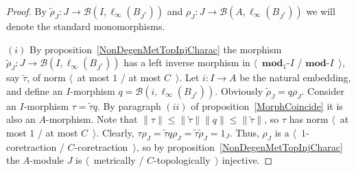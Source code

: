 \begin{proof} By $\widetilde{\rho}_J:J\to\mathcal{B}(I,\ell_\infty(B_{J^*}))$
and $\rho_J:J\to\mathcal{B}(A,\ell_\infty(B_{J^*}))$ we will denote the standard
monomorphisms.

$(i)$ By proposition~\ref{NonDegenMetTopInjCharac} the morphism
$\widetilde{\rho}_J: J\to\mathcal{B}(I,\ell_\infty(B_{J^*}))$ has a left inverse
morphism in $\langle$~$\mathbf{mod}_1\text{-}I$ / $\mathbf{mod}\text{-}I$~$\rangle$, say
$\widetilde{\tau}$, of norm $\langle$~at most $1$ / at most $C$~$\rangle$. Let
$i:I\to A$ be the natural embedding, and define an $I$-morphism
$q=\mathcal{B}(i,\ell_\infty(B_{J^*}))$. Obviously
$\widetilde{\rho}_J=q\rho_J$. Consider an $I$-morphism $\tau =\widetilde{\tau} q$.
By paragraph $(ii)$ of proposition~\ref{MorphCoincide} it is also an
$A$-morphism. Note that 
$\lVert\tau \rVert
\leq\lVert\widetilde{\tau}\rVert\lVert q\rVert
\leq\lVert\widetilde{\tau}\rVert$, 
so $\tau$ has norm $\langle$~at most $1$ / at most $C$~$\rangle$. 
Clearly, 
$\tau \rho_J=\widetilde{\tau} q\rho_J=\widetilde{\tau}\widetilde{\rho}_J=1_J$. 
Thus, $\rho_J$ is a $\langle$~$1$-coretraction / $C$-coretraction~$\rangle$, 
so by proposition~\ref{NonDegenMetTopInjCharac} the $A$-module $J$ is
$\langle$~metrically / $C$-topologically~$\rangle$ injective.


\end{proof}
